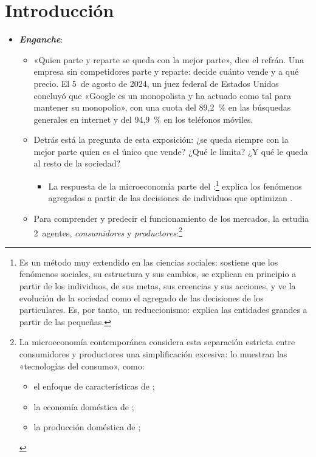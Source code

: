 \documentclass[11pt]{article}
\begin{document}
\tceetitulo

\section*{Introducción}

\begin{itemize}
\item \textbf{\emph{Enganche}}:
  \begin{itemize}
  \item «Quien parte y reparte se queda con la mejor parte», dice el refrán. Una empresa sin competidores parte y reparte: decide cuánto vende y a qué precio. El 5~de agosto de 2024, un juez federal de Estados Unidos concluyó que «Google es un monopolista y ha actuado como tal para mantener su monopolio», con una cuota del 89,2~\% en las búsquedas generales en internet y del 94,9~\% en los teléfonos móviles\nocite{Mehta2024Google}.
  \item Detrás está la pregunta de esta exposición: ¿se queda siempre con la mejor parte quien es el único que vende? ¿Qué le limita? ¿Y qué le queda al resto de la sociedad?
    \begin{itemize}
    \item La respuesta de la microeconomía parte del :\footnote{Es un método muy extendido en las ciencias sociales: sostiene que los fenómenos sociales, su estructura y sus cambios, se explican en principio a partir de los individuos, de sus metas, sus creencias y sus acciones, y ve la evolución de la sociedad como el agregado de las decisiones de los particulares. Es, por tanto, un reduccionismo: explica las entidades grandes a partir de las pequeñas.} explica los fenómenos agregados a partir de las decisiones de individuos que optimizan .
    \end{itemize}
  \item Para comprender y predecir el funcionamiento de los mercados, la  estudia 2~agentes, \emph{consumidores} y \emph{productores}:\footnote{La microeconomía contemporánea considera esta separación estricta entre consumidores y productores una simplificación excesiva\nocite{EkelundHebert2013History}: lo muestran las «tecnologías del consumo», como:
\begin{itemize}
\item el enfoque de características de ;
\item la economía doméstica de ;
\item la producción doméstica de ;

\end{itemize}}
\end{itemize}
\end{itemize}
\end{document}
